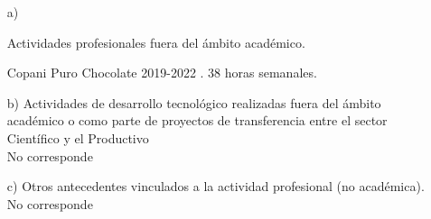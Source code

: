 \begin{enumerate}[leftmargin=0.8cm]

  \item[a)]{Actividades profesionales fuera del ámbito académico.

    \begin{itemize}[leftmargin=0.2cm]

      {Copani Puro Chocolate}
      {2019-2022 . 38 horas semanales.}
      {}

    \end{itemize}

  }

  \item[b)]{Actividades de desarrollo tecnológico realizadas fuera del ámbito académico o como parte de proyectos de
transferencia entre el sector Científico y el Productivo
    \\ No corresponde
  }

  \item[c)]{Otros antecedentes vinculados a la actividad profesional (no académica).
    \\ No corresponde
  }

\end{enumerate}
